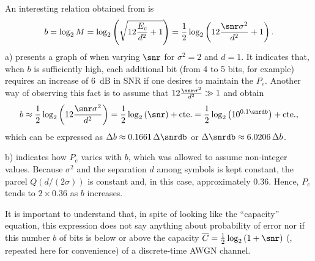 An interesting relation obtained from  is
\begin{equation}
b = \log_2 M = \log_2 \left( \sqrt{ 12 \frac{E_c}{d^2}+1 } \right) = \frac 1 2 \log_2 \left(  12 \frac{\snr \sigma^2}{d^2}+1  \right).
\label{eq:pambits}
\end{equation}			 			
 a) presents a graph of  when varying $\snr$ for $\sigma^2=2$ and $d=1$. It indicates that, when $b$ is sufficiently high, each additional bit (from 4 to 5 bits, for example) requires an increase of 6~dB in SNR if one desires to maintain the $P_e$. Another way of observing this fact is to assume that $12 \frac{\snr \sigma^2}{d^2} \gg 1$ and obtain
\[
b \approx \frac 1 2 \log_2 \left(  12 \frac{\snr \sigma^2}{d^2} \right) = 
\frac 1 2 \log_2 \left(  \snr \right) + \textrm{cte.} = \frac 1 2 \log_2 \left(  10^{0.1\snrdb} \right) + \textrm{cte.},
\]
which can be expressed as $\Delta b \approx 0.1661 \, \Delta \snrdb$ or $\Delta \snrdb \approx 6.0206 \, \Delta b$.

 b) indicates how $P_e$ varies with $b$, which was allowed to assume non-integer values.
Because $\sigma^2$ and the separation $d$ among symbols is kept constant, the parcel $Q \left( d/(2 \sigma) \right)$ is constant and, in this case, approximately 0.36. Hence, $P_e$ tends to $2 \times 0.36$ as $b$ increases. 

It is important to understand that, in spite of  looking like the ``capacity'' equation, this expression does not say anything about probability of error nor if this number $b$ of bits is below or above the capacity $\overline C = \frac 1 2 \log_2 \left(1+\snr\right)$ (, repeated here for convenience) of a discrete-time AWGN channel.


